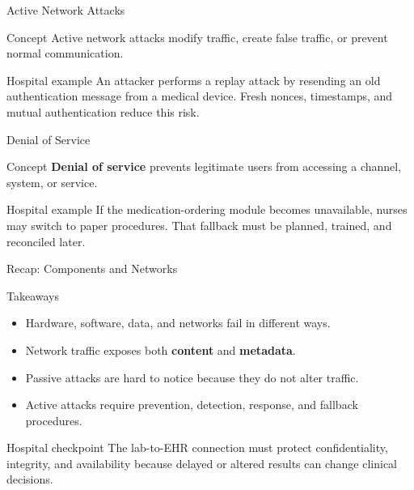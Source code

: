 \documentclass[presentation]{beamer}
\begin{document}
\begin{frame}[c]{Active Network Attacks}
\begin{block}{Concept}
Active network attacks modify traffic, create false traffic, or prevent normal communication.
\end{block}

\begin{exampleblock}{Hospital example}
An attacker performs a replay attack by resending an old authentication message from a medical
device. Fresh nonces, timestamps, and mutual authentication reduce this risk.
\end{exampleblock}
\end{frame}

\begin{frame}[c]{Denial of Service}
\begin{block}{Concept}
\textbf{Denial of service} prevents legitimate users from accessing a channel, system, or service.
\end{block}

\begin{exampleblock}{Hospital example}
If the medication-ordering module becomes unavailable, nurses may switch to paper procedures.
That fallback must be planned, trained, and reconciled later.
\end{exampleblock}
\end{frame}

\begin{frame}[c]{Recap: Components and Networks}
\begin{block}{Takeaways}
\begin{itemize}
    \item Hardware, software, data, and networks fail in different ways.
    \item Network traffic exposes both \textbf{content} and \textbf{metadata}.
    \item Passive attacks are hard to notice because they do not alter traffic.
    \item Active attacks require prevention, detection, response, and fallback procedures.
\end{itemize}
\end{block}

\begin{exampleblock}{Hospital checkpoint}
The lab-to-EHR connection must protect confidentiality, integrity, and availability because
delayed or altered results can change clinical decisions.
\end{exampleblock}
\end{frame}
\end{document}
